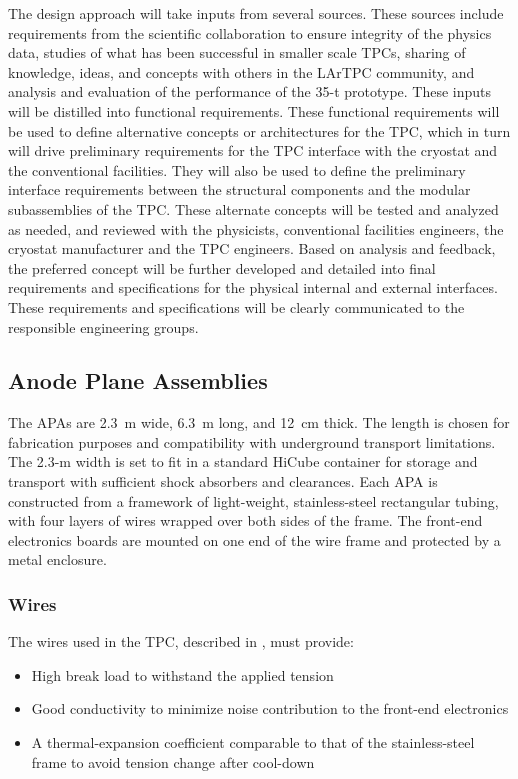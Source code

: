 The design approach will take inputs from several sources.  These sources include requirements from the scientific collaboration to ensure integrity of the physics data, studies of what has been successful in smaller scale TPCs, sharing of knowledge, ideas, and concepts with others in the LArTPC community, and analysis and evaluation of the performance of the 35-t prototype.  These inputs will be distilled into functional requirements.  These functional requirements will be used to define alternative concepts or architectures for the TPC, which in turn will drive preliminary requirements for the TPC interface with the cryostat and the conventional facilities.  They will also be used to define the preliminary interface requirements between the structural components and the modular subassemblies of the TPC.  These alternate concepts will be tested and analyzed as needed, and reviewed with the physicists, conventional facilities engineers, the cryostat manufacturer and the TPC engineers.  Based on analysis and feedback, the preferred concept will be further developed and detailed into final requirements and specifications for the physical internal and external interfaces.  These requirements and specifications will be clearly communicated to the responsible engineering groups.


\subsection{Anode Plane Assemblies}
\label{subsec:fd-ref-apa}
The APAs are 2.3~m wide, 6.3~m long, and 12~cm thick. The length is chosen for fabrication purposes and compatibility with underground transport limitations. The 2.3-m width is set to fit in a standard HiCube container for storage and transport with sufficient shock absorbers and clearances. 
Each APA is constructed from a framework of light-weight, stainless-steel rectangular tubing, with four layers of wires wrapped over both sides of the frame. The front-end electronics boards are mounted on one end of the wire frame and protected by a metal enclosure.  

\subsubsection{Wires}
\label{subsec:fd-ref-wires}

The wires used in the TPC, described in , must provide:
\begin{itemize}
\item High break load to withstand the applied tension 
\item Good conductivity to minimize noise contribution to the front-end electronics
\item A thermal-expansion coefficient comparable to that of the stainless-steel 
frame to avoid tension change after cool-down
\end{itemize}

